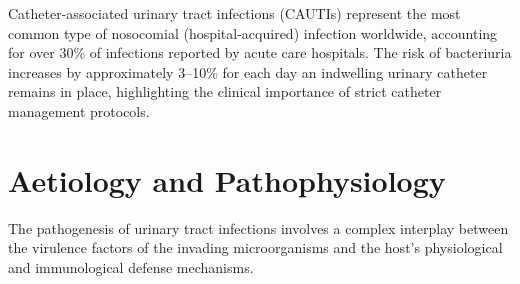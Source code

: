 Catheter-associated urinary tract infections (CAUTIs) represent the most common type of nosocomial (hospital-acquired) infection worldwide, accounting for over 30\% of infections reported by acute care hospitals. The risk of bacteriuria increases by approximately 3--10\% for each day an indwelling urinary catheter remains in place, highlighting the clinical importance of strict catheter management protocols.

\section*{Aetiology and Pathophysiology}
The pathogenesis of urinary tract infections involves a complex interplay between the virulence factors of the invading microorganisms and the host's physiological and immunological defense mechanisms.

